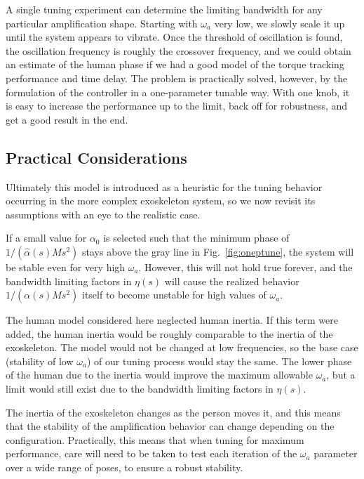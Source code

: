 \documentclass[utf8]{frontiersSCNS}
\newcommand{\add}[1]{\textcolor[HTML]{8710b3}{#1}}
\begin{document}
A single tuning experiment can determine the limiting bandwidth for any particular amplification shape.
Starting with $\omega_a$ very low, we slowly scale it up until the system appears to vibrate. Once the threshold of oscillation is found, the oscillation frequency is roughly the crossover frequency, and we could obtain an estimate of the human phase if we had a good model of the torque tracking performance and time delay. The problem is practically solved, however, by the formulation of the controller in a one-parameter tunable way. With one knob, it is easy to increase the performance up to the limit, back off for robustness, and get a good result in the end.

\subsection{Practical Considerations}
Ultimately this model is introduced as a heuristic for the tuning behavior occurring in the more complex exoskeleton system, so we now revisit its assumptions with an eye to the realistic case. 

If a small value for $\alpha_0$ is selected such that the minimum phase of $1/(\widehat\alpha(s)Ms^2)$ stays above the gray line in Fig.~\ref{fig:oneptune}, the system will be stable even for very high $\omega_a$. However, this will not hold true forever, and the bandwidth limiting factors in $\eta(s)$ will cause \add{the} realized behavior $1/(\alpha(s)Ms^2)$ itself to become unstable for high values of $\omega_a$.


The human model considered here neglected human inertia. If this term were added, the human inertia would be roughly comparable to the inertia of the exoskeleton. The model would not be changed at low frequencies, so the base case (stability of low $\omega_a$) of our tuning process would stay the same. The lower phase of the human due to the inertia would improve the maximum allowable $\omega_a$, but a limit would still exist due to the bandwidth limiting factors in $\eta(s)$.

The inertia of the exoskeleton changes as the person moves it, and this means that the stability of the amplification behavior can change depending on the configuration. Practically, this means that when tuning for maximum performance, care will need to be taken to test each iteration of the $\omega_a$ parameter over a wide range of poses, to ensure a robust stability. 
\end{document}
